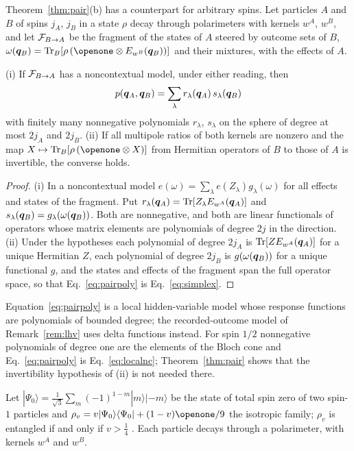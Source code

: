 Theorem~\ref{thm:pair}(b) has a counterpart for arbitrary spins. Let particles $A$ and $B$ of spins $j_A$, $j_B$ in a state $\rho$ decay through polarimeters with kernels $w^A$, $w^B$, and let $\mathcal{F}_{B\to A}$ be the fragment of the states of $A$ steered by outcome sets of $B$, $\omega(\bq_B)=\Tr_B[\rho\,(\openone\otimes E_{w^B}(\bq_B))]$ and their mixtures, with the effects of $A$.

\begin{proposition}
\label{prop:pairpoly}
(i) If $\mathcal{F}_{B\to A}$ has a noncontextual model, under either reading, then
\begin{equation}
p(\bm{q}_A,\bm{q}_B)=\sum_\lambda r_\lambda(\bm{q}_A)\,s_\lambda(\bm{q}_B)
\label{eq:pairpoly}
\end{equation}
with finitely many nonnegative polynomials $r_\lambda$, $s_\lambda$ on the sphere of degree at most $2j_A$ and $2j_B$.
(ii) If all multipole ratios of both kernels are nonzero and the map $X\mapsto\Tr_B[\rho\,(\openone\otimes X)]$ from Hermitian operators of $B$ to those of $A$ is invertible, the converse holds.
\end{proposition}

\begin{proof}
(i) In a noncontextual model $e(\omega)=\sum_\lambda e(Z_\lambda)g_\lambda(\omega)$ for all effects and states of the fragment. Put $r_\lambda(\bm{q}_A)=\operatorname{Tr}[Z_\lambda E_{w^A}(\bm{q}_A)]$ and $s_\lambda(\bm{q}_B)=g_\lambda(\omega(\bm{q}_B))$. Both are nonnegative, and both are linear functionals of operators whose matrix elements are polynomials of degree $2j$ in the direction. (ii) Under the hypotheses each polynomial of degree $2j_A$ is $\operatorname{Tr}[ZE_{w^A}(\bm{q}_A)]$ for a unique Hermitian $Z$, each polynomial of degree $2j_B$ is $g(\omega(\bm{q}_B))$ for a unique functional $g$, and the states and effects of the fragment span the full operator space, so that Eq.~\eqref{eq:pairpoly} is Eq.~\eqref{eq:simplex}.
\end{proof}

Equation~\eqref{eq:pairpoly} is a local hidden-variable model whose response functions are polynomials of bounded degree; the recorded-outcome model of Remark~\ref{rem:lhv} uses delta functions instead. For spin $1/2$ nonnegative polynomials of degree one are the elements of the Bloch cone and Eq.~\eqref{eq:pairpoly} is Eq.~\eqref{eq:localnc}; Theorem~\ref{thm:pair} shows that the invertibility hypothesis of (ii) is not needed there.

Let $|\Psi_0\rangle=\tfrac{1}{\sqrt3}\sum_m(-1)^{1-m}|m\rangle|{-m}\rangle$ be the state of total spin zero of two spin-$1$ particles and $\rho_v=v|\Psi_0\rangle\langle\Psi_0|+(1-v)\openone/9$ the isotropic family; $\rho_v$ is entangled if and only if $v>\tfrac14$ \cite{horodecki1999}. Each particle decays through a polarimeter, with kernels $w^A$ and $w^B$.

